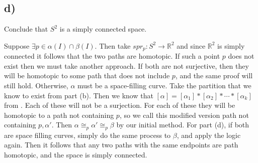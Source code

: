 \documentclass{article}
\theoremstyle{definition}
\begin{document}
\subsection*{d)}
\begin{mdframed}
    Conclude that $S^2$ is a simply connected space.
\end{mdframed}
Suppose $\exists p \in \alpha(I) \cap \beta(I)$. Then take $spr_p : S^2 \rightarrow \mathbb{R}^2$ and since $\mathbb{R}^2$ is simply connected it follows that the two paths are homotopic.
    If such a point $p$ does not exist then we must take another approach. If both are not surjective, then they will be homotopic to some path that does not include $p$,
    and the same proof will still hold. Otherwise, $\alpha$ must be a space-filling curve.
    Take the partition that we know to exist from part (b). Then we know that $[\alpha] = [\alpha_1] * [\alpha_2] * \cdots * [\alpha_k]$ from .
    Each of these will not be a surjection. For each of these they will be homotopic to a path not containing $p$, so we call this modified version path not containing $p, \alpha'$.
    Then $\alpha \cong_p \alpha' \cong_p \beta$ by our initial method. For part (d), if both are space filling curves, simply do the same process to $\beta$, and apply the logic again. Then 
    it follows that any two paths with the same endpoints are path homotopic, and the space is simply connected.
\end{document}
